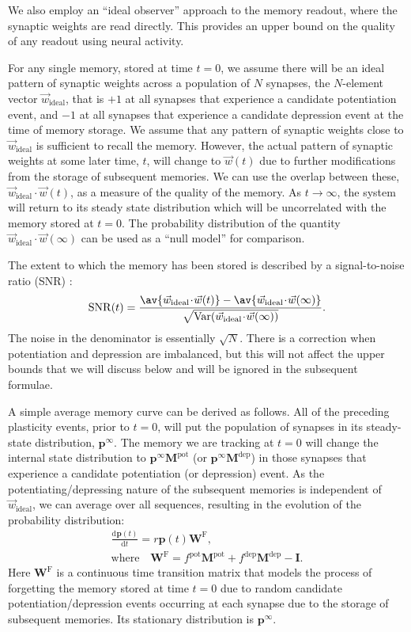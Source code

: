 \documentclass[9pt,twocolumn,twoside,lineno]{pnas-new}
\newcommand{\cdt}{\!\cdot\!}
\newcommand{\diff}[3][]{\frac{\mathrm{d}^{#1} #2}{\mathrm{d}{#3}^{#1}}}
\DeclareMathOperator{\var}{Var}
\DeclareMathOperator{\snr}{SNR}
\newcommand{\wv}{\vec{w}}
\newcommand{\wvi}{\vec{w}_\text{ideal}}
\newcommand{\I}{\mathbf{I}}
\newcommand{\prob}{\mathbf{p}}
\newcommand{\eq}{\prob^\infty}
\newcommand{\W}{\mathbf{W}}
\newcommand{\M}{\mathbf{M}}
\newcommand{\frg}{\W^{\mathrm{F}}}
\newcommand{\pot}{^{\text{pot}}}
\newcommand{\dep}{^{\text{dep}}}
\begin{document}
We also employ an ``ideal observer'' approach to the memory readout, where the synaptic weights are read directly.
This provides an upper bound on the quality of any readout using neural activity.

For any single memory, stored at time $t=0$, we assume there will be an ideal pattern of synaptic weights across a population of $N$ synapses, the $N$-element vector $\wvi$, that is $+1$ at all synapses that experience a candidate potentiation event, and $-1$ at all synapses that experience a candidate depression event at the time of memory storage.
We assume that any pattern of synaptic weights close to $\wvi$ is sufficient to recall the memory.
However, the actual pattern of synaptic weights at some later time, $t$, will change to $\wv(t)$ due to further modifications from the storage of subsequent memories.
We can use the overlap between these, $\wvi\cdt\wv(t)$, as a measure of the quality of the memory.
As $t\to\infty$, the system will return to its steady state distribution which will be uncorrelated with the memory stored at $t=0$.
The probability distribution of the quantity $\wvi\cdt\wv(\infty)$ can be used as a ``null model'' for comparison.

The extent to which the memory has been stored is described by a signal-to-noise ratio (SNR) \cite{Fusi2005cascade,Fusi2007multistate}:
%
\begin{equation}\label{eq:SNRdef}
  \snr(t) = \frac{\av{\wv_\text{ideal}\cdt\wv(t)} - \av{\wv_\text{ideal}\cdt\wv(\infty)}}
     {\sqrt{\var(\wv_\text{ideal}\cdt\wv(\infty))}}.
\end{equation}
%
The noise in the denominator is essentially $\sqrt{N}$.
There is a correction when potentiation and depression are imbalanced, but this will not affect the upper bounds that we will discuss below and will be ignored in the subsequent formulae.

A simple average memory curve can be derived as follows.
All of the preceding plasticity events, prior to $t=0$, will put the population of synapses in its steady-state distribution, $\eq$.
The memory we are tracking at $t=0$ will change the internal state distribution to $\eq\M\pot$ (or $\eq\M\dep$) in those synapses that experience a candidate potentiation (or depression) event.
As the potentiating/depressing nature of the subsequent memories is independent of $\wvi$, we can average over all sequences, resulting in the evolution of the probability distribution:
%
\begin{multline}\label{eq:evol}
  \diff{\prob(t)}{t} = r\prob(t)\frg,
  \\ \text{where} \quad
  \frg = f\pot\M\pot + f\dep\M\dep - \I.
\end{multline}
%
Here $\frg$ is a continuous time transition matrix that models the process of forgetting the memory stored at time $t=0$ due to random candidate potentiation/depression events occurring at each synapse due to the storage of subsequent memories.
Its stationary distribution is $\eq$.
\end{document}
